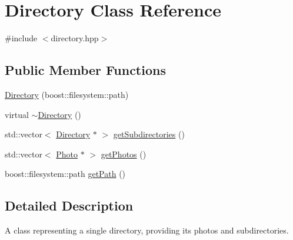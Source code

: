 \hypertarget{classDirectory}{\section{Directory Class Reference}
\label{classDirectory}
}


{\ttfamily \#include $<$directory.\-hpp$>$}

\subsection*{Public Member Functions}
\begin{DoxyCompactItemize}
\item 
\hyperlink{classDirectory_ac4f097b510017a9db117ba67bdb4e166}{Directory} (boost\-::filesystem\-::path)
\item 
virtual \hyperlink{classDirectory_a91f2b79f7a0aa2f5aae46dad007224ad}{$\sim$\-Directory} ()
\item 
std\-::vector$<$ \hyperlink{classDirectory}{Directory} $\ast$ $>$ \hyperlink{classDirectory_afe019eeb475d70563075d13ab639dd1b}{get\-Subdirectories} ()
\item 
std\-::vector$<$ \hyperlink{classPhoto}{Photo} $\ast$ $>$ \hyperlink{classDirectory_a033a571a0b63be4ff0d62ac48eb6a3dd}{get\-Photos} ()
\item 
boost\-::filesystem\-::path \hyperlink{classDirectory_a6d3bd18de51048986eeeee73f40b5536}{get\-Path} ()
\end{DoxyCompactItemize}


\subsection{Detailed Description}
A class representing a single directory, providing its photos and subdirectories. 

